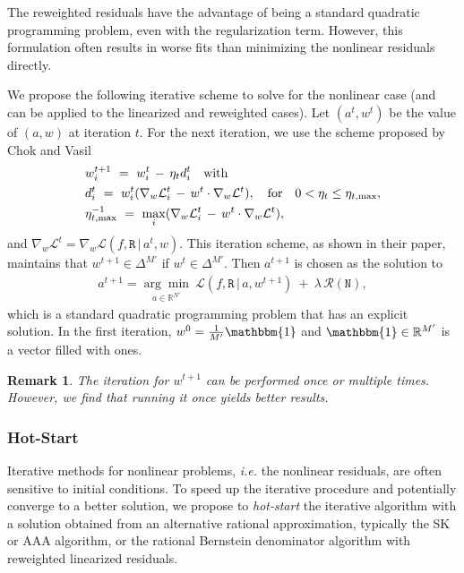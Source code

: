 \documentclass{article}
\newtheorem{remark}{Remark}
\newcommand{\NN}{{\mathtt N}}
\newcommand{\RR}{{\mathtt R}}
\begin{document}
The reweighted residuals have the advantage of being a standard quadratic programming problem, even with the regularization term. However, this formulation often results in worse fits than minimizing the nonlinear residuals directly. 

We propose the following iterative scheme to solve for the nonlinear case (and can be applied to the linearized and reweighted cases). Let $(a^t, w^t)$ be the value of $(a, w)$ at iteration $t$. For the next iteration, we use the scheme proposed by Chok and Vasil \cite{james_vasil}
\begin{align}
    & w^{t+1}_i\ =\ w^t_i\, -\, \eta_t d^t_i\quad \text{with}\\
    \notag&d^t_i\ =\ w^t_i(\nabla_w\mathcal{L}^t_i\, -\, w^t\cdot\nabla_w \mathcal{L}^t),\quad\text{for}\quad 0 < \eta_t \leq \eta_{t,\max},\\
    \notag& \eta_{t,\max}^{-1}\ =\ \max_i(\nabla_{w}\mathcal{L}^t_i\, -\, w^t\cdot \nabla_w\mathcal{L}^t),
\end{align}
and $\nabla_w\mathcal{L}^t = \nabla_w\mathcal{L}(f, \RR\, |\, a^t, w)$. This iteration scheme, as shown in their paper, maintains that $w^{t+1}\in\Delta^{M'}$ if $w^t\in\Delta^{M'}$. Then $a^{t+1}$ is chosen as the solution to
\begin{eqnarray}
    a^{t+1} = \underset{a\in\mathbb{R}^{N'}}{\arg \min}\ \mathcal{L}(f, \RR\, |\, a, w^{t+1})\ +\ \lambda\, \mathcal{R}(\NN),
\end{eqnarray}
which is a standard quadratic programming problem that has an explicit solution. In the first iteration, $w^{0}=\frac{1}{{M}'}\mathbbm{1}$ and $\mathbbm{1}\in\mathbb{R}^{{M}'}$ is a vector filled with ones. 

\begin{remark}
    The iteration for $w^{t+1}$ can be performed once or multiple times. However, we find that running it once yields better results.
\end{remark}

\subsubsection{Hot-Start}
Iterative methods for nonlinear problems, \textit{i.e.} the nonlinear residuals, are often sensitive to initial conditions. To speed up the iterative procedure and potentially converge to a better solution, we propose to \textit{hot-start} the iterative algorithm with a solution obtained from an alternative rational approximation, typically the SK or AAA algorithm, or the rational Bernstein denominator algorithm with reweighted linearized residuals.
\end{document}

